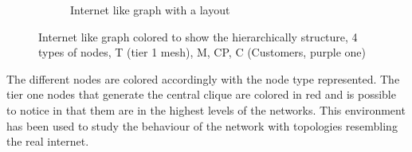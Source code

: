 \begin{figure}[ht]
\begin{subfigure}[b]{0.37\textwidth}
		 \caption{Internet like graph with a  layout}
         \label{fig:internet_graph_hierarchical}
     \end{subfigure}
        \caption{Internet like graph colored to show the hierarchically structure,
4 types of nodes, T (tier 1 mesh), M, CP, C (Customers, purple one)}
        \label{fig:internet_graphs}
\end{figure}

The different nodes are colored accordingly with the node type represented.
The tier one nodes that generate the central clique are colored in red and
is possible to notice in  that them are
in the highest levels of the networks.
This environment has been used to study the behaviour of the network with 
topologies resembling the real internet.
